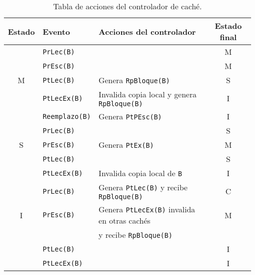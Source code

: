 \begin{table}
\centering
\begin{tabular}{c l l c}
    \toprule
    Estado & Evento & Acciones del controlador & Estado final \\
    \toprule
           & \verb|PrLec(B)| & & M \\
    \midrule
    & \verb|PrEsc(B)| & & M \\
    \midrule
    M & \verb|PtLec(B)| & Genera \verb|RpBloque(B)| & S \\
    \midrule
      & \verb|PtLecEx(B)| & Invalida copia local y genera \verb|RpBloque(B)| & I \\
    \midrule
      & \verb|Reemplazo(B)| & Genera \verb|PtPEsc(B)| & I \\
    \bottomrule
      & \verb|PrLec(B)| & & S \\
    \midrule
    S & \verb|PrEsc(B)| & Genera \verb|PtEx(B)| & M \\
    \midrule
      & \verb|PtLec(B)| & & S \\
    \midrule
      & \verb|PtLecEx(B)| & Invalida copia local de \verb|B| & I \\
    \toprule
      & \verb|PrLec(B)| & Genera \verb|PtLec(B)| y recibe \verb|RpBloque(B)| & C \\
    \midrule
    I & \verb|PrEsc(B)| & Genera \verb|PtLecEx(B)| invalida en otras cachés & M \\
      & & y recibe \verb|RpBloque(B)| & \\
    \midrule
      & \verb|PtLec(B)| & & I \\
    \midrule
      & \verb|PtLecEx(B)| & & I \\
    \bottomrule
\end{tabular}
\caption{Tabla de acciones del controlador de caché.}
\label{tab:acciones_controlador_MSI}
\end{table}

